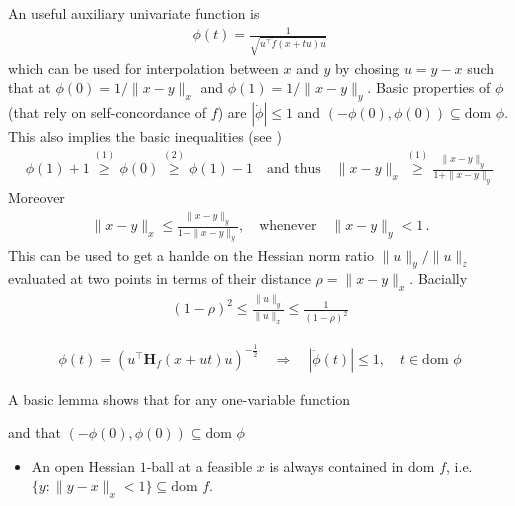 \documentclass{article}
\renewcommand{\H}{{\mathcal H}}
\newcommand{\dom}[1]{{\text{dom $#1$}}}
\renewcommand{\H}{{\mathbf H}}
\begin{document}
An useful auxiliary univariate function is
\begin{align}
\phi(t) = \frac{1}{\sqrt{u^\top \ddot f(x+ t u) u }}
\end{align}
which can be used for interpolation between $x$ and $y$ by chosing $u = y-x$ such that at $\phi(0)=1 / \|x-y\|_x$ and $\phi(1) = 1/\| x-y\|_y$. Basic properties  of $\phi$ (that rely on self-concordance of $f$) are $|\dot \phi| \le 1$ and $(-\phi(0), \phi(0)) \subseteq \dom{\phi}$. This also implies the basic inequalities (see \cite[Theorem 4.1.5]{nesterov1998introductory})
\begin{align}
\phi(1) + 1 \stackrel{(1)}\ge \phi(0) \stackrel{(2)}\ge \phi(1)-1 \quad \text{and thus} \quad 
\| x-y\|_x \stackrel{(1)}\ge \frac{\| x-y\|_y}{1+\|x-y\|_y}
\end{align}
Moreover 
\begin{align}
\| x -y\|_x \le \frac{\| x-y\|_y}{1-\| x-y\|_y}, \quad \text{whenever} \quad \|x-y\|_y<1\,.
\end{align}
This can be used to get a hanlde on the Hessian norm ratio $\|u\|_y/\|u\|_z$ evaluated at two points in terms of their distance $\rho=\|x-y\|_x$. Bacially \cite[Theorem 4.1.6]{nesterov1998introductory}
\begin{align}
(1-\rho)^2 \le \frac{\| u\|_y}{\| u\|_x}  \le \frac{1}{(1-\rho)^2}
\end{align}

\newpage

\begin{align}
\phi(t) = \left( u^\top \H_f(x+ut) u \right)^{-\frac 12} \quad 
\Longrightarrow \quad |\dot\phi(t)| \le 1, \quad t \in \text{dom $\phi$}
\end{align}

A basic lemma shows that for any one-variable function

and that $(-\phi(0), \phi(0)) \subseteq \text{dom $\phi$}$ 

\begin{itemize}
\setlength{\itemsep}{0mm}
\item An open Hessian $1$-ball at a feasible $x$ is always contained in $\text{dom $f$}$, i.e.~$\{ y: \| y-x\|_x < 1\} \subseteq \text{dom $f$}$.
\end{itemize}






\end{document}
